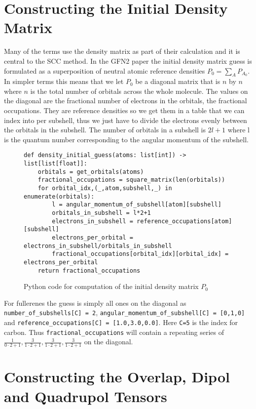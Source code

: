 \section{Constructing the Initial Density Matrix}
Many of the terms use the density matrix as part of their calculation and it is central to the SCC method. In the GFN2 paper the initial density matrix guess is formulated as a superposition of neutral atomic reference densities $P_0 = \sum_{A}P_{A_0}$. In simpler terms this means that we let $P_0$ be a diagonal matrix that is $n$ by $n$ where $n$ is the total number of orbitals across the whole molecule. The values on the diagonal are the fractional number of electrons in the orbitals, the fractional occupations. They are reference densities so we get them in a table that we can index into per subshell, thus we just have to divide the electrons evenly between the orbitals in the subshell. The number of orbitals in a subshell is $2l+1$ where l is the quantum number corresponding to the angular momentum of the subshell.
\begin{figure}[H]
\begin{verbatim}
def density_initial_guess(atoms: list[int]) -> list[list[float]]:
    orbitals = get_orbitals(atoms)
    fractional_occupations = square_matrix(len(orbitals))
    for orbital_idx,(_,atom,subshell,_) in enumerate(orbitals):
        l = angular_momentum_of_subshell[atom][subshell] 
        orbitals_in_subshell = l*2+1 
        electrons_in_subshell = reference_occupations[atom][subshell]
        electrons_per_orbital = electrons_in_subshell/orbitals_in_subshell
        fractional_occupations[orbital_idx][orbital_idx] = electrons_per_orbital
    return fractional_occupations
\end{verbatim}
\caption{Python code for computation of the initial density matrix $P_0$}
    \label{lst:orbitals}
\end{figure}
For fullerenes the guess is simply all ones on the diagonal as \verb|number_of_subshells[C] = 2|, \verb|angular_momentum_of_subshell[C] = [0,1,0]| and \verb|reference_occupations[C] = [1.0,3.0,0.0]|.
Here \verb|C=5| is the index for carbon. 
Thus \verb|fractional_occupations| will contain a repeating series of $\frac{1}{0\cdot2+1},\frac{3}{1\cdot2+1},\frac{3}{1\cdot2+1},\frac{3}{1\cdot2+1}$ on the diagonal.

\section{Constructing the Overlap, Dipol and Quadrupol Tensors}

